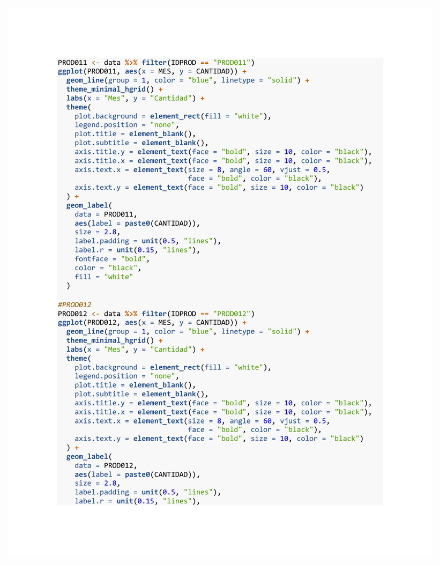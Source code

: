 \begin{figure}[h!]
        \begin{tcolorbox}[colback=white, colframe=black, boxrule=1.5pt, sharp corners=all]
            {\includegraphics[width=\linewidth, height=22cm, trim=2.5cm 2.5cm 2.5cm 2.5cm, clip]{images/script12.pdf}}
        \end{tcolorbox}
\end{figure}

